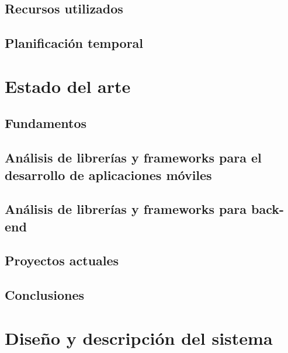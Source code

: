 \documentclass[twoside, openright, 11pt]{report}
\begin{document}
  \section{Recursos utilizados}
  
  \section{Planificación temporal}
  

\chapter{Estado del arte}\label{cap.estado del arte}
  \section{Fundamentos}
  	
  \section{Análisis de librerías y frameworks para el desarrollo de aplicaciones móviles}
    

  \section{Análisis de librerías y frameworks para back-end}
  	
  \section{Proyectos actuales}

  \section{Conclusiones}

\chapter{Diseño y descripción del sistema}\label{cap.diseno y descripcion del sistema} %
\end{document}
